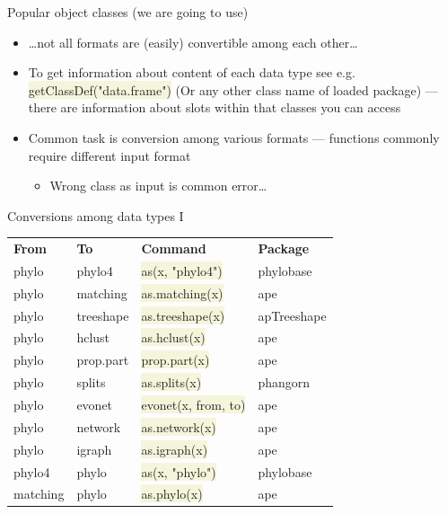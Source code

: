 \documentclass[compress, xelatex, 11pt, xcolor=svgnames, aspectratio=169,
	hyperref={
		bookmarks=true,
		unicode=true,
		colorlinks=true,
		pdftitle={Molecular data in R},
		plainpages=false,
		pdfauthor={Vojtech Zeisek},
		pdfsubject={Course about phylogeny and evolution in R},
		pdfcreator={XeLaTeX},
		pdfkeywords={R, evolution, phylogeny, molecular data},
		linkcolor=Crimson, %
		anchorcolor=Magenta, %
		citecolor=Magenta, %
		filecolor=Magenta, %
		menucolor=Magenta, %
		urlcolor=DodgerBlue, %
		},
	url={hyphens, lowtilde} %
	]{beamer}
\renewcommand{\texttt}[1]{\colorbox{Beige}{{\ttfamily #1}}}
\begin{document}
\begin{frame}[allowframebreaks]{Popular object classes (we are going to use)}
\begin{itemize}
		\item \ldots not all formats are (easily) convertible among each other\ldots
		\item To get information about content of each data type see e.g. \texttt{getClassDef("data.frame")} (Or any other class name of loaded package) --- there are information about slots within that classes you can access
		\item Common task is conversion among various formats --- functions commonly require different input format
		\begin{itemize}
		 \item Wrong class as input is common error\ldots
		\end{itemize}
	\end{itemize}
\end{frame}

\begin{frame}{Conversions among data types I}
	\begin{tabular}{llll}
		\textbf{From} & \textbf{To} & \textbf{Command} & \textbf{Package}\\
		phylo & phylo4 & \texttt{as(x, "phylo4")} & phylobase\\
		phylo & matching & \texttt{as.matching(x)} & ape\\
		phylo & treeshape & \texttt{as.treeshape(x)} & apTreeshape\\
		phylo & hclust & \texttt{as.hclust(x)} & ape\\
		phylo & prop.part & \texttt{prop.part(x)} & ape\\
		phylo & splits & \texttt{as.splits(x)} & phangorn\\
		phylo & evonet & \texttt{evonet(x, from, to)} & ape\\
		phylo & network & \texttt{as.network(x)} & ape\\
		phylo & igraph & \texttt{as.igraph(x)} & ape\\
		phylo4 & phylo & \texttt{as(x, "phylo")} & phylobase\\
		matching & phylo & \texttt{as.phylo(x)} & ape
	\end{tabular}
\end{frame}
\end{document}
